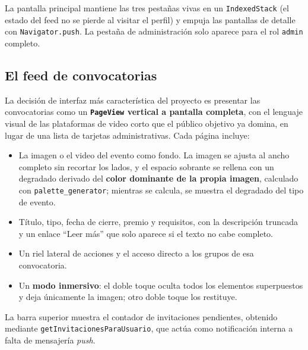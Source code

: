 \documentclass[12pt,a4paper]{article}
\begin{document}
La pantalla principal mantiene las tres pestañas vivas en un \texttt{IndexedStack} (el estado del feed no se pierde al visitar el perfil) y empuja las pantallas de detalle con \texttt{Navigator.push}. La pestaña de administración solo aparece para el rol \texttt{admin} completo.

\subsection{El feed de convocatorias}
La decisión de interfaz más característica del proyecto es presentar las convocatorias como un \textbf{\texttt{PageView} vertical a pantalla completa}, con el lenguaje visual de las plataformas de video corto que el público objetivo ya domina, en lugar de una lista de tarjetas administrativas. Cada página incluye:

\begin{itemize}
    \item La imagen o el video del evento como fondo. La imagen se ajusta al ancho completo sin recortar los lados, y el espacio sobrante se rellena con un degradado derivado del \textbf{color dominante de la propia imagen}, calculado con \texttt{palette\_generator}; mientras se calcula, se muestra el degradado del tipo de evento.
    \item Título, tipo, fecha de cierre, premio y requisitos, con la descripción truncada y un enlace ``Leer más'' que solo aparece si el texto no cabe completo.
    \item Un riel lateral de acciones y el acceso directo a los grupos de esa convocatoria.
    \item Un \textbf{modo inmersivo}: el doble toque oculta todos los elementos superpuestos y deja únicamente la imagen; otro doble toque los restituye.
\end{itemize}

La barra superior muestra el contador de invitaciones pendientes, obtenido mediante \texttt{getInvitacionesParaUsuario}, que actúa como notificación interna a falta de mensajería \emph{push}.
\end{document}
